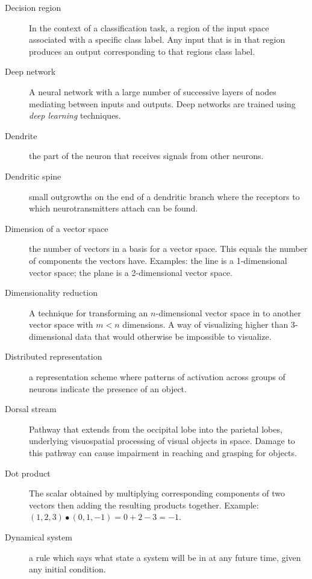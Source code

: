 \begin{description}
\item[Decision region] In the context of a classification task, a region of the input space associated with a specific class label. Any input that is in that region produces an output corresponding to that regions class label.

\item[Deep network] A neural network with a large number of successive layers of nodes mediating between inputs and outputs. Deep networks are trained using \emph{deep learning} techniques.

\item[Dendrite] the part of the neuron that receives signals from other neurons.

\item[Dendritic spine] small outgrowths on the end of a dendritic branch where the receptors to which neurotransmitters attach can be found.

\item[Dimension of a vector space] the number of vectors in a basis for a vector space. This equals the number of components the vectors have. Examples: the line is a 1-dimensional vector space; the plane is a 2-dimensional vector space.

\item[Dimensionality reduction] A technique for transforming an $n$-dimensional vector space in to another vector space with $m<n$ dimensions. A way of visualizing higher than 3-dimensional data that would otherwise be impossible to visualize.


\item[Distributed representation] a representation scheme where patterns of activation across groups of neurons indicate the presence of an object. 

\item[Dorsal stream] Pathway that extends from the occipital lobe into the parietal lobes, underlying visuospatial processing of visual objects in space. Damage to this pathway can cause impairment in reaching and grasping for objects. 

\item[Dot product] The scalar obtained by multiplying corresponding components of two vectors then adding the resulting products together. Example: $(1,2,3) \bullet (0,1,-1) = 0+2-3 = -1$.

\item[Dynamical system] a rule which says what state a system will be in at any future time, given any initial condition.


\end{description}
